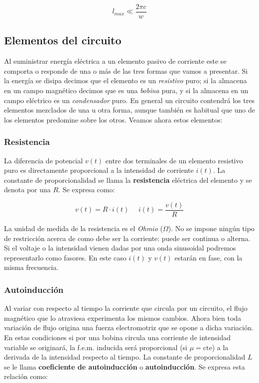 \documentclass[12pt]{article}
\begin{document}
\begin{equation}
l_{max} \ll \frac{2 \pi c}{w}
\end{equation}


\subsection{Elementos del circuito}

Al suministrar energía eléctrica a un elemento pasivo de corriente este se comporta o responde de una o más de las tres formas que vamos a presentar. Si la energía se disipa decimos que el elemento es un \textit{resistivo} puro; si la almacena en un campo magnético decimos que es una \textit{bobina}  pura, y si la almacena en un campo eléctrico es un \textit{condensador} puro. En general un circuito contendrá los tres elementos mezclados de una u otra forma, aunque también es habitual que uno de los elementos predomine sobre los otros. Veamos ahora estos elementos:

\subsubsection{Resistencia}

La diferencia de potencial $v(t)$ entre dos terminales de un elemento resistivo puro es directamente proporcional a la intensidad de corriente $i(t)$. La constante de proporcionalidad se llama la \textbf{resistencia} eléctrica del elemento y se denota por una $R$. Se expresa como:

\begin{equation}
v(t) = R \cdot i(t) \ \ \ \ \ \  i(t) = \dfrac{v(t)}{R}
\end{equation}

La unidad de medida de la resistencia es el \textit{Ohmio} ($\Omega$). No se impone ningún tipo de restricción acerca de como debe ser la corriente: puede ser continua o alterna.\\

Si el voltaje o la intensidad vienen dadas por una onda sinusoidal podremos representarlo como fasores. En este caso $i(t)$ y $v(t)$ estarán en fase, con la misma frecuencia.
 
 
 
\subsubsection{Autoinducción}

Al variar con respecto al tiempo la corriente que circula por un circuito, el flujo magnético que lo atraviesa experimenta los mismos cambios. Ahora bien toda variación de flujo origina una fuerza electromotriz que se opone a dicha variación. En estas condiciones si por una bobina circula una corriente de intensidad variable se originará, la f.e.m. inducida será proporcional (si $\mu = \mathrm{cte}$) a la derivada de la intensidad respecto al tiempo. La constante de proporcionalidad $L$ se le llama \textbf{coeficiente de autoinducción} o \textbf{autoinducción}. Se expresa esta relación como:
\end{document}
